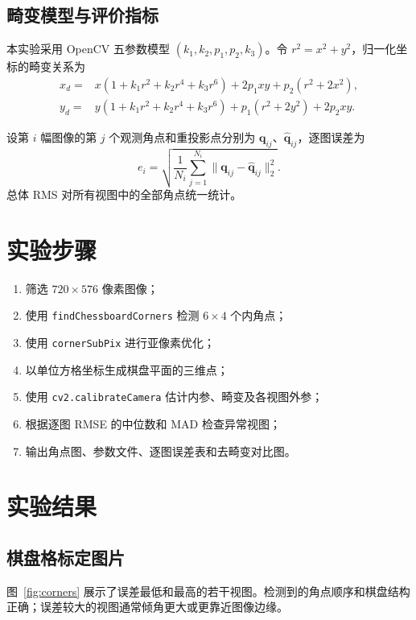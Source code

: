 \documentclass[UTF8,a4paper,12pt]{ctexart}
\begin{document}
\subsection{畸变模型与评价指标}

本实验采用 OpenCV 五参数模型 $(k_1,k_2,p_1,p_2,k_3)$。令 $r^2=x^2+y^2$，归一化坐标的畸变关系为
\begin{align}
  x_d={}&x(1+k_1r^2+k_2r^4+k_3r^6)+2p_1xy+p_2(r^2+2x^2),\\
  y_d={}&y(1+k_1r^2+k_2r^4+k_3r^6)+p_1(r^2+2y^2)+2p_2xy.
\end{align}

设第 $i$ 幅图像的第 $j$ 个观测角点和重投影点分别为 $\bm q_{ij}$、$\hat{\bm q}_{ij}$，逐图误差为
\begin{equation}
  e_i=\sqrt{\frac{1}{N_i}\sum_{j=1}^{N_i}
  \lVert\bm q_{ij}-\hat{\bm q}_{ij}\rVert_2^2}.
\end{equation}
总体 RMS 对所有视图中的全部角点统一统计。

\section{实验步骤}

\begin{enumerate}
  \item 筛选 $720\times576$ 像素图像；
  \item 使用 \texttt{findChessboardCorners} 检测 $6\times4$ 个内角点；
  \item 使用 \texttt{cornerSubPix} 进行亚像素优化；
  \item 以单位方格坐标生成棋盘平面的三维点；
  \item 使用 \texttt{cv2.calibrateCamera} 估计内参、畸变及各视图外参；
  \item 根据逐图 RMSE 的中位数和 MAD 检查异常视图；
  \item 输出角点图、参数文件、逐图误差表和去畸变对比图。
\end{enumerate}

\section{实验结果}

\subsection{棋盘格标定图片}

图~\ref{fig:corners} 展示了误差最低和最高的若干视图。检测到的角点顺序和棋盘结构正确；误差较大的视图通常倾角更大或更靠近图像边缘。
\end{document}
